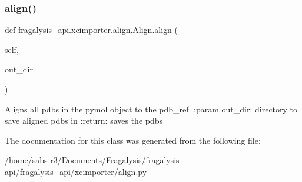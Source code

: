\subsubsection{\texorpdfstring{align()}{align()}}
{\footnotesize\ttfamily def fragalysis\+\_\+api.\+xcimporter.\+align.\+Align.\+align (\begin{DoxyParamCaption}\item[{}]{self,  }\item[{}]{out\+\_\+dir }\end{DoxyParamCaption})}

\begin{DoxyVerb}Aligns all pdbs in the pymol object to the pdb_ref.
:param out_dir: directory to save aligned pdbs in
:return: saves the pdbs
\end{DoxyVerb}
 

The documentation for this class was generated from the following file\+:\begin{DoxyCompactItemize}
\item 
/home/sabs-\/r3/\+Documents/\+Fragalysis/fragalysis-\/api/fragalysis\+\_\+api/xcimporter/align.\+py\end{DoxyCompactItemize}
